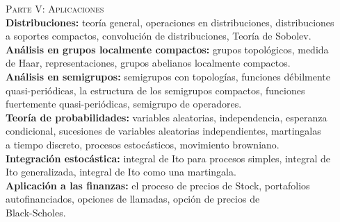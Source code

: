 \documentclass[12pt,letterpaper]{article}
\newcommand\tab[1][1.5cm]{\hspace*{#1}}
\begin{document}
\tab \textsc{Parte V: Aplicaciones}\\
\tab \qquad \textbf{Distribuciones:} teoría general, operaciones en distribuciones, distribuciones \\
	\tab \qquad \qquad a soportes compactos, convolución de distribuciones, Teoría de Sobolev.\\
\tab \qquad \textbf{Análisis en grupos localmente compactos:} grupos topológicos, medida \\
	\tab \qquad \qquad de Haar, representaciones, grupos abelianos localmente compactos.\\
\tab \qquad \textbf{Análisis en semigrupos:} semigrupos con topologías, funciones débilmente \\
	\tab \qquad \qquad quasi-periódicas, la estructura de los semigrupos compactos, funciones \\
	\tab \qquad \qquad fuertemente quasi-periódicas, semigrupo de operadores.\\
\tab \qquad \textbf{Teoría de probabilidades:} variables aleatorias, independencia, esperanza \\
	\tab \qquad \qquad condicional, sucesiones de variables aleatorias independientes, martingalas \\
	\tab \qquad \qquad a tiempo discreto, procesos estocásticos, movimiento browniano. \\
\tab \qquad \textbf{Integración estocástica:} integral de Ito para procesos simples, integral de \\ 
	\tab \qquad \qquad Ito generalizada, integral de Ito como una martingala.\\
\tab \qquad \textbf{Aplicación a las finanzas:} el proceso de precios de Stock, portafolios \\
	\tab \qquad \qquad autofinanciados, opciones de llamadas, opción de precios de \\
	\tab \qquad \qquad Black-Scholes.\\

\
\end{document}

